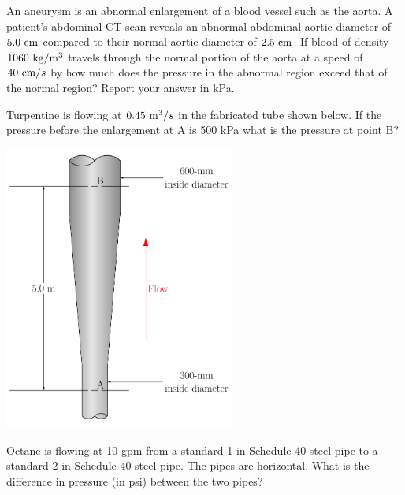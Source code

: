 \documentclass[multi,preview,varwidth=false,border=5,12pt]{standalone}
\begin{document}
\begin{question}

An aneurysm is an abnormal enlargement of a blood vessel such as the aorta.  A  patient's abdominal CT scan reveals an abnormal abdominal aortic diameter of $5.0~\mathrm{cm}$ compared to their normal aortic diameter of $2.5~\mathrm{cm}$.  If blood of density $1060~\mathrm{kg}/\mathrm{m}^3$ travels through the normal portion of the aorta at a speed of $40~\mathrm{cm}/s$ by how much does the pressure in the abnormal region exceed that of the normal region?  Report your answer in kPa.

\begin{solution}
\end{solution}

\end{question}



\begin{question}

Turpentine is flowing at $0.45~\mathrm{m}^3/s$ in the fabricated tube shown below.  If the pressure before the enlargement at A is 500 kPa what is the pressure at point B?

\includegraphics[width=3in]{imgs/PipeExp1.pdf}


\begin{solution}
\end{solution}

\end{question}


\begin{question}

Octane is flowing at 10 gpm from a standard 1-in Schedule 40 steel pipe to a standard 2-in Schedule 40 steel pipe.  The pipes are horizontal.  What is the difference in pressure (in psi) between the two pipes?

\begin{solution}
\end{solution}

\end{question}
\end{document}
